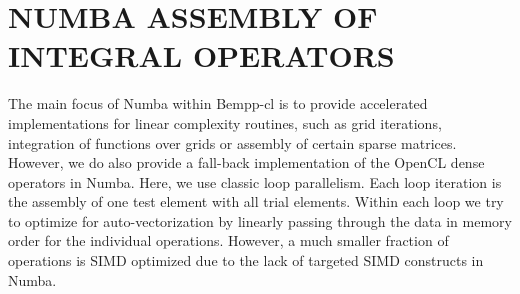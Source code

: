 \section{NUMBA ASSEMBLY OF INTEGRAL OPERATORS}

The main focus of Numba within Bempp-cl is to provide accelerated implementations for linear complexity routines, such as grid iterations, integration of functions over grids or assembly of certain sparse matrices. However, we do also provide a fall-back implementation of the OpenCL dense operators in Numba. Here, we use classic loop parallelism. Each loop iteration is the assembly of one test element with all trial elements. Within each loop we try to optimize for auto-vectorization by linearly passing through the data in memory order for the individual operations. However, a much smaller fraction of operations is SIMD optimized due to the lack of targeted SIMD constructs in Numba.
